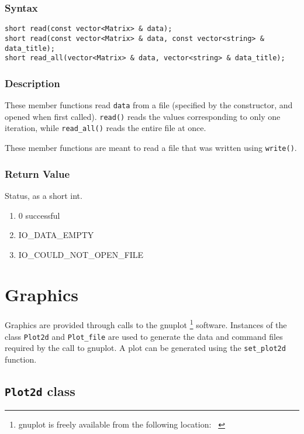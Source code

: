 \documentclass[11pt,fleqn,letterpaper]{report}
\begin{document}
\subsubsection*{Syntax}
\begin{verbatim}
short read(const vector<Matrix> & data);
short read(const vector<Matrix> & data, const vector<string> & data_title);
short read_all(vector<Matrix> & data, vector<string> & data_title);
\end{verbatim}

\subsubsection*{Description}   
These member functions read \texttt{data} from a file (specified by
the constructor, and opened when first called). \texttt{read()} reads
the values corresponding to only one iteration, while
\texttt{read\_all()} reads the entire file at once.

\noindent
These member functions are meant to read a file that was written using
\texttt{write()}.

\subsubsection*{Return Value}
Status, as a short int.
\begin{enumerate}
\item[] 0 successful
\item[] IO\_DATA\_EMPTY
\item[] IO\_COULD\_NOT\_OPEN\_FILE
\end{enumerate}

\newpage 

\section{Graphics}

Graphics are provided through calls to the \textsf{gnuplot} \footnote{
  \textsf{gnuplot} is freely available from the following location:
  {\tt
    }
  } software. Instances of the class {\tt Plot2d} and {\tt Plot\_file} are used 
to generate the data and command files required by the call to \textsf{gnuplot}. 
A plot can be generated using the \texttt{set\_plot2d} function.
\newpage 

\subsection*{\texttt{Plot2d} class}
\end{document}
